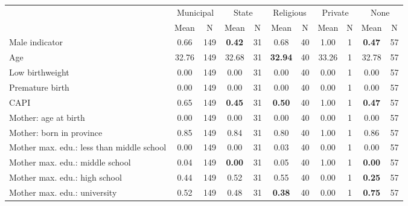 \begin{tabular}{l c c c c c c c c c c}
\toprule
& \multicolumn{2}{c}{Municipal} & \multicolumn{2}{c}{State} & \multicolumn{2}{c}{Religious} & \multicolumn{2}{c}{Private} & \multicolumn{2}{c}{None} \\
& \scriptsize Mean & \scriptsize N & \scriptsize Mean & \scriptsize N & \scriptsize Mean & \scriptsize N & \scriptsize Mean & \scriptsize N & \scriptsize Mean & \scriptsize N \\
\midrule
Male indicator &      0.66 &       149 & \textbf{     0.42} &        31 &      0.68 &        40 &      1.00 &         1 & \textbf{     0.47} &        57 \\
Age &     32.76 &       149 &     32.68 &        31 & \textbf{    32.94} &        40 &     33.26 &         1 &     32.78 &        57 \\
Low birthweight &      0.00 &       149 &      0.00 &        31 &      0.00 &        40 &      0.00 &         1 &      0.00 &        57 \\
Premature birth &      0.00 &       149 &      0.00 &        31 &      0.00 &        40 &      0.00 &         1 &      0.00 &        57 \\
CAPI &      0.65 &       149 & \textbf{     0.45} &        31 & \textbf{     0.50} &        40 &      1.00 &         1 & \textbf{     0.47} &        57 \\
Mother: age at birth &      0.00 &       149 &      0.00 &        31 &      0.00 &        40 &      0.00 &         1 &      0.00 &        57 \\
Mother: born in province &      0.85 &       149 &      0.84 &        31 &      0.80 &        40 &      1.00 &         1 &      0.86 &        57 \\
Mother max. edu.: less than middle school &      0.00 &       149 &      0.00 &        31 &      0.03 &        40 &      0.00 &         1 &      0.00 &        57 \\
Mother max. edu.: middle school &      0.04 &       149 & \textbf{     0.00} &        31 &      0.05 &        40 &      1.00 &         1 & \textbf{     0.00} &        57 \\
Mother max. edu.: high school &      0.44 &       149 &      0.52 &        31 &      0.55 &        40 &      0.00 &         1 & \textbf{     0.25} &        57 \\
Mother max. edu.: university &      0.52 &       149 &      0.48 &        31 & \textbf{     0.38} &        40 &      0.00 &         1 & \textbf{     0.75} &        57 \\

\end{tabular}
